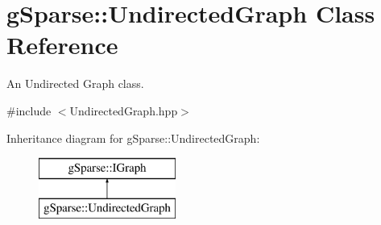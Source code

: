\hypertarget{classg_sparse_1_1_undirected_graph}{}\section{g\+Sparse\+:\+:Undirected\+Graph Class Reference}
\label{classg_sparse_1_1_undirected_graph}


An Undirected Graph class.  




{\ttfamily \#include $<$Undirected\+Graph.\+hpp$>$}

Inheritance diagram for g\+Sparse\+:\+:Undirected\+Graph\+:\begin{figure}[H]
\begin{center}
\leavevmode
\includegraphics[height=2.000000cm]{classg_sparse_1_1_undirected_graph}
\end{center}
\end{figure}
